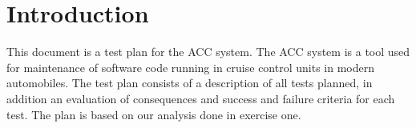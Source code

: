 \chapter{Introduction}

	This document is a test plan for the ACC system. The ACC system is a 
	tool used for maintenance of software code running in cruise control units in modern 
	automobiles. The test plan consists of a description of all tests planned, in addition 
	an evaluation of consequences and success and failure criteria for each test. 
	The plan is based on our analysis done in exercise one.


